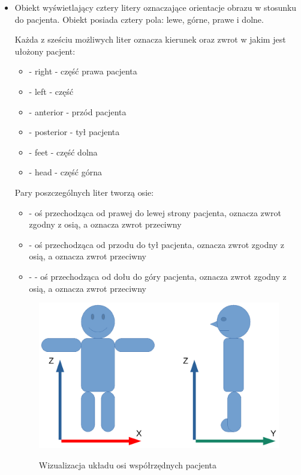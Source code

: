 \begin{itemize}
    \item {}

          Obiekt wyświetlający cztery litery oznaczające orientacje obrazu w stosunku do pacjenta.
          Obiekt posiada cztery pola: lewe, górne, prawe i dolne.

          Każda z sześciu możliwych liter oznacza kierunek oraz zwrot w jakim jest ułożony pacjent:
          \begin{itemize}
              \item {} - right - część prawa pacjenta
              \item {} - left - część
              \item {} - anterior - przód pacjenta
              \item {} - posterior - tył pacjenta
              \item {} - feet - część dolna
              \item {} - head - część górna
          \end{itemize}

          Pary poszczególnych liter tworzą osie:
          \begin{itemize}
              \item {} - oś przechodząca od prawej do lewej strony pacjenta,  oznacza zwrot zgodny z osią, a  oznacza zwrot przeciwny

              \item {} - oś przechodząca od przodu do tył pacjenta,  oznacza zwrot zgodny z osią, a  oznacza zwrot przeciwny

              \item {} -  - oś przechodząca od dołu do góry pacjenta,  oznacza zwrot zgodny z osią, a  oznacza zwrot przeciwny

          \end{itemize}

          \begin{figure}[!htbp]
              \caption{Wizualizacja układu osi współrzędnych pacjenta}
              \includegraphics[width=\textwidth]{img/imageorientationindicator-003.pdf}
              \centering
              \label{fig:imageorientationindicator2}
          \end{figure}


\end{itemize}
